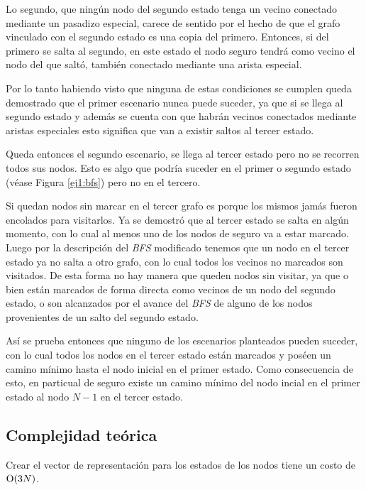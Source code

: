 	Lo segundo, que ningún nodo del segundo estado tenga un vecino conectado
	mediante un pasadizo especial, carece de sentido por el hecho de que el
	grafo vinculado con el segundo estado es una copia del primero. Entonces, si
	del primero se salta al segundo, en este estado el nodo seguro tendrá como
	vecino el nodo del que saltó, también conectado mediante una arista
	especial.

	Por lo tanto habiendo visto que ninguna de estas condiciones se cumplen
	queda demostrado que el primer escenario nunca puede suceder, ya que si se
	llega al segundo estado y además se cuenta con que habrán vecinos conectados
	mediante aristas especiales esto significa que van a existir saltos al
	tercer estado.

	Queda entonces el segundo escenario, se llega al tercer estado pero no se
	recorren todos sus nodos. Esto es algo que podría suceder en el primer o
	segundo estado (véase Figura \ref{ej1:bfs}) pero no en el tercero.

	Si quedan nodos sin marcar en el tercer grafo es porque los mismos jamás
	fueron encolados para visitarlos. Ya se demostró que al tercer estado se
	salta en algún momento, con lo cual al menos uno de los nodos de
	seguro va a estar marcado. Luego por la descripción del \emph{BFS}
	modificado tenemos que un nodo en el tercer estado ya no salta a otro grafo,
	con lo cual todos los vecinos no marcados son visitados. De esta forma no
	hay manera que queden nodos sin visitar, ya que o bien están marcados de
	forma directa como vecinos de un nodo del segundo estado, o son alcanzados por
	el avance del \emph{BFS} de alguno de los nodos provenientes de un salto del segundo estado.

	Así se prueba entonces que ninguno de los escenarios planteados pueden
	suceder, con lo cual todos los nodos en el tercer estado están marcados y
	poséen un camino mínimo hasta el nodo inicial en el primer estado. Como
	consecuencia de esto, en particual de seguro existe un camino mínimo del
	nodo incial en el primer estado al nodo $N - 1$ en el tercer estado.

    \subsection{Complejidad teórica}
    Crear el vector de representación para los estados de los nodos tiene un
	costo de $\operatorname{O}(3N)$.

